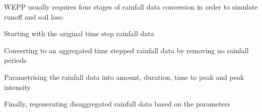 


%

WEPP usually requires four stages of rainfall data conversion in order to
simulate runoff and soil loss:
\begin{enumerate*}
  \item Starting with the original time step rainfall data
  \item Converting to an aggregated time stepped rainfall data by removing no
rainfall periods
  \item Parametrising the rainfall data into amount, duration, time to peak and
peak intensity
  \item Finally, regenerating disaggregated rainfall data based on the
parameters
\end{enumerate*}

